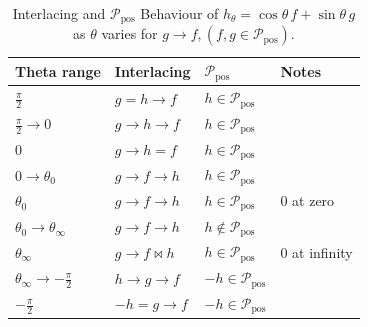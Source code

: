 \documentclass[11pt]{article}
\theoremstyle{breakdef}
\begin{document}
\begin{table}[ht]
\centering
\begin{tabular}{llll}
\hline
\textbf{Theta range} 
& \textbf{Interlacing} 
& \textbf{$\mathcal{P_{\mathrm{pos}}}$} 
& \textbf{Notes} \\
\hline

$\tfrac{\pi}{2} $ 
& $g = h \to f$ 
& $h \in \mathcal{P_{\mathrm{pos}}}$ 
& \\

$\tfrac{\pi}{2} \rightarrow 0$ 
& $g \to h \to f$ 
& $h \in \mathcal{P_{\mathrm{pos}}}$ 
& \\

$ 0$ 
& $g \to h = f$ 
& $h \in \mathcal{P_{\mathrm{pos}}}$ 
& \\


$0 \rightarrow \theta_{0}$ 
& $g \to f \to h$ 
& $h \in \mathcal{P_{\mathrm{pos}}}$ 
& \\

$\theta_{0}$ 
& $g \to f \to h$ 
& $h \in \mathcal{P_{\mathrm{pos}}}$ 
& $0$ at zero \\

$\theta_{0} \rightarrow \theta_{\infty}$ 
& $g \to f \to h$ 
& $h \notin \mathcal{P_{\mathrm{pos}}}$ 
& \\

$\theta_{\infty}$ 
& $g \to f \bowtie h$ 
& $h \in \mathcal{P_{\mathrm{pos}}}$ 
& $0$ at infinity \\

$\theta_{\infty} \rightarrow -\tfrac{\pi}{2}$ 
& $h \to g \to f$ 
& $-h \in \mathcal{P_{\mathrm{pos}}}$ 
& \\

$-\tfrac{\pi}{2}$ 
& $-h = g \to f$ 
& $-h \in \mathcal{P_{\mathrm{pos}}}$ 
& \\

\hline
\end{tabular}
\caption{Interlacing and $\mathcal{P_{\mathrm{pos}}}$ Behaviour of $h_\theta = 
\cos\theta\,f + \sin\theta\,g$ as $\theta$ varies for $g \to f, (f,g \in \mathcal{P_{\mathrm{pos}}})$.}
\end{table}
\end{document}
